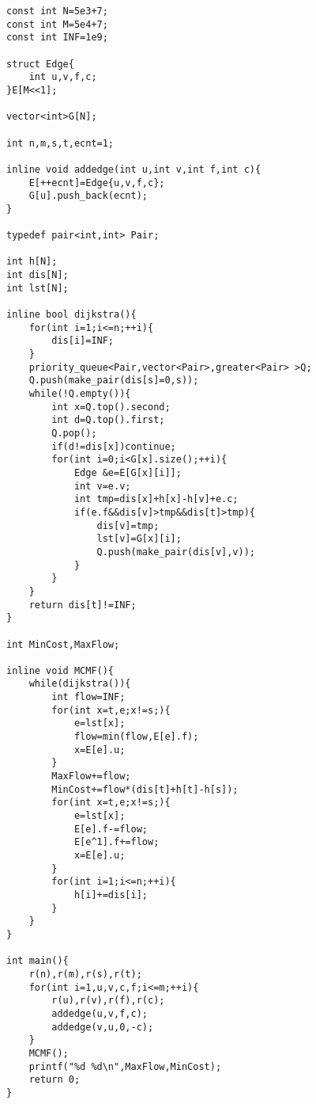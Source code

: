 \documentclass{ctexart}
\begin{document}
\begin{lstlisting}
const int N=5e3+7;
const int M=5e4+7;
const int INF=1e9;

struct Edge{
	int u,v,f,c;
}E[M<<1];

vector<int>G[N];

int n,m,s,t,ecnt=1;

inline void addedge(int u,int v,int f,int c){
	E[++ecnt]=Edge{u,v,f,c};
	G[u].push_back(ecnt);
}

typedef pair<int,int> Pair;

int h[N];
int dis[N];
int lst[N];

inline bool dijkstra(){
	for(int i=1;i<=n;++i){
		dis[i]=INF;
	}
	priority_queue<Pair,vector<Pair>,greater<Pair> >Q;
	Q.push(make_pair(dis[s]=0,s));
	while(!Q.empty()){
		int x=Q.top().second;
		int d=Q.top().first;
		Q.pop();
		if(d!=dis[x])continue;
		for(int i=0;i<G[x].size();++i){
			Edge &e=E[G[x][i]];
			int v=e.v;
			int tmp=dis[x]+h[x]-h[v]+e.c;
			if(e.f&&dis[v]>tmp&&dis[t]>tmp){
				dis[v]=tmp;
				lst[v]=G[x][i];
				Q.push(make_pair(dis[v],v));
			}
		}
	}
	return dis[t]!=INF;
}

int MinCost,MaxFlow;

inline void MCMF(){
	while(dijkstra()){
		int flow=INF;
		for(int x=t,e;x!=s;){
			e=lst[x];
			flow=min(flow,E[e].f);
			x=E[e].u;
		}
		MaxFlow+=flow;
		MinCost+=flow*(dis[t]+h[t]-h[s]);
		for(int x=t,e;x!=s;){
			e=lst[x];
			E[e].f-=flow;
			E[e^1].f+=flow;
			x=E[e].u;
		}
		for(int i=1;i<=n;++i){
			h[i]+=dis[i];
		}
	}
}

int main(){
	r(n),r(m),r(s),r(t);
	for(int i=1,u,v,c,f;i<=m;++i){
		r(u),r(v),r(f),r(c);
		addedge(u,v,f,c);
		addedge(v,u,0,-c);
	}
	MCMF();
	printf("%d %d\n",MaxFlow,MinCost);
	return 0;
}
\end{lstlisting}
\end{document}
